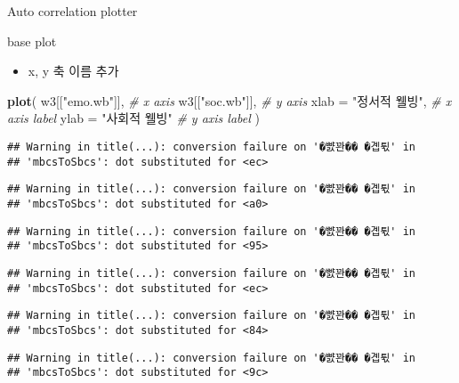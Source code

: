 \documentclass[ignorenonframetext,]{beamer}
\newenvironment{Shaded}{\begin{snugshade}}{\end{snugshade}}
\newcommand{\KeywordTok}[1]{\textcolor[rgb]{0.13,0.29,0.53}{\textbf{#1}}}
\newcommand{\DataTypeTok}[1]{\textcolor[rgb]{0.13,0.29,0.53}{#1}}
\newcommand{\StringTok}[1]{\textcolor[rgb]{0.31,0.60,0.02}{#1}}
\newcommand{\CommentTok}[1]{\textcolor[rgb]{0.56,0.35,0.01}{\textit{#1}}}
\newcommand{\NormalTok}[1]{#1}
\providecommand{\tightlist}{%
  \setlength{\itemsep}{0pt}\setlength{\parskip}{0pt}}
\begin{document}
\begin{frame}[fragile]{Auto correlation plotter}

\begin{block}{base plot}

\begin{itemize}
\tightlist
\item
  x, y 축 이름 추가
\end{itemize}

\begin{Shaded}
\begin{Highlighting}[]
\KeywordTok{plot}\NormalTok{(}
\NormalTok{    w3[[}\StringTok{"emo.wb"}\NormalTok{]], }\CommentTok{# x axis}
\NormalTok{    w3[[}\StringTok{"soc.wb"}\NormalTok{]], }\CommentTok{# y axis}
    \DataTypeTok{xlab =} \StringTok{"정서적 웰빙"}\NormalTok{, }\CommentTok{# x axis label}
    \DataTypeTok{ylab =} \StringTok{"사회적 웰빙"} \CommentTok{# y axis label}
\NormalTok{    ) }
\end{Highlighting}
\end{Shaded}

\begin{verbatim}
## Warning in title(...): conversion failure on '�뺤꽌�� �곕튃' in
## 'mbcsToSbcs': dot substituted for <ec>
\end{verbatim}

\begin{verbatim}
## Warning in title(...): conversion failure on '�뺤꽌�� �곕튃' in
## 'mbcsToSbcs': dot substituted for <a0>
\end{verbatim}

\begin{verbatim}
## Warning in title(...): conversion failure on '�뺤꽌�� �곕튃' in
## 'mbcsToSbcs': dot substituted for <95>
\end{verbatim}

\begin{verbatim}
## Warning in title(...): conversion failure on '�뺤꽌�� �곕튃' in
## 'mbcsToSbcs': dot substituted for <ec>
\end{verbatim}

\begin{verbatim}
## Warning in title(...): conversion failure on '�뺤꽌�� �곕튃' in
## 'mbcsToSbcs': dot substituted for <84>
\end{verbatim}

\begin{verbatim}
## Warning in title(...): conversion failure on '�뺤꽌�� �곕튃' in
## 'mbcsToSbcs': dot substituted for <9c>
\end{verbatim}


\end{block}
\end{frame}
\end{document}
